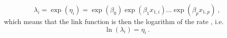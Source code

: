 \begin{equation}
    \lambda_i = \exp(\eta_i) = \exp(\beta_0)\exp(\beta_1x_{1, i})...\exp(\beta_px_{1, p}) \ ,
\end{equation} 
which means that the link function is then the logarithm of the rate \citep{GLMM_book}, i.e.
\begin{equation}
    \ln (\lambda_i) = \eta_i \ .
\end{equation}








